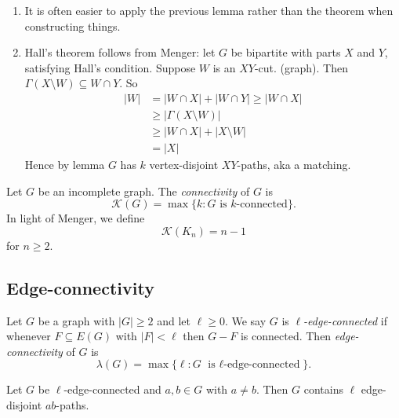 \documentclass[a4paper]{article}
\begin{document}
\begin{remark}\leavevmode
  \begin{enumerate}
  \item It is often easier to apply the previous lemma rather than the theorem when constructing things.
  \item Hall's theorem follows from Menger: let \(G\) be bipartite with parts \(X\) and \(Y\), satisfying Hall's condition. Suppose \(W\) is an \(XY\)-cut. (graph). Then \(\Gamma(X \setminus W) \subseteq W \cap Y\). So
    \begin{align*}
      |W|
      &= |W \cap X| + |W \cap Y| \geq |W \cap X| \\
      &\geq |\Gamma(X \setminus W)| \\
      &\geq |W \cap X| + |X \setminus W| \\
      &= |X|
    \end{align*}
    Hence by lemma \(G\) has \(k\) vertex-disjoint \(XY\)-paths, aka a matching.
  \end{enumerate}
\end{remark}

\begin{definition}
  Let \(G\) be an incomplete graph. The \emph{connectivity} of \(G\) is
  \[
    \mathcal K(G) = \max\{k: G \text{ is \(k\)-connected}\}.
  \]
  In light of Menger, we define
  \[
    \mathcal K(K_n) = n - 1
  \]
  for \(n \geq 2\).
\end{definition}

\subsection{Edge-connectivity}

\begin{definition}
  Let \(G\) be a graph with \(|G| \geq 2\) and let \(\ell \geq 0\). We say \(G\) is \emph{\(\ell\)-edge-connected} if whenever \(F \subseteq E(G)\) with \(|F| < \ell\) then \(G - F\) is connected. Then \emph{edge-connectivity} of \(G\) is
  \[
    \lambda(G) = \max\{\ell: G \text{ is \(\ell\)-edge-connected}\}.
  \]
\end{definition}

\begin{corollary}
  Let \(G\) be \(\ell\)-edge-connected and \(a, b \in G\) with \(a \neq b\). Then \(G\) contains \(\ell\) edge-disjoint \(ab\)-paths.
\end{corollary}
\end{document}
